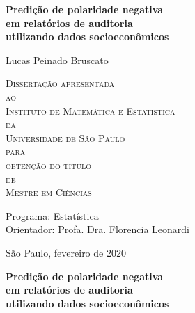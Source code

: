 \documentclass[12pt,twoside,a4paper]{book}
\begin{document}
\frontmatter 
\fancyhead[RO]{{\footnotesize\rightmark}\hspace{2em}\thepage}
\setcounter{tocdepth}{2}
\fancyhead[LE]{\thepage\hspace{2em}\footnotesize{\leftmark}}
\fancyhead[RE,LO]{}
\fancyhead[RO]{{\footnotesize\rightmark}\hspace{2em}\thepage}
\onehalfspacing  %

\thispagestyle{empty}
\begin{center}
    \vspace*{2.3cm}
    
    \Large{\textbf{Predição de polaridade negativa\\
    em relatórios de auditoria\\
    utilizando dados socioeconômicos}}
    
    \vspace*{1.2cm}
    \Large{Lucas Peinado Bruscato}
    
    \vskip 2cm
    \textsc{
    Dissertação apresentada\\[-0.25cm] 
    ao\\[-0.25cm]
    Instituto de Matemática e Estatística\\[-0.25cm]
    da\\[-0.25cm]
    Universidade de São Paulo\\[-0.25cm]
    para\\[-0.25cm]
    obtenção do título\\[-0.25cm]
    de\\[-0.25cm]
    Mestre em Ciências}
    
    \vskip 1.5cm
    Programa: Estatística\\
    Orientador: Profa. Dra. Florencia Leonardi

    \vskip 1cm
    \normalsize{}
    
    \vskip 0.5cm
    \normalsize{São Paulo, fevereiro de 2020}
\end{center}


\newpage
\thispagestyle{empty}
\begin{center}
    \vspace*{2.3 cm}
    
    \textbf{\Large{Predição de polaridade negativa\\
    em relatórios de auditoria\\
    utilizando dados socioeconômicos}}\\
    
    \vspace*{2 cm}
\end{center}
\end{document}
